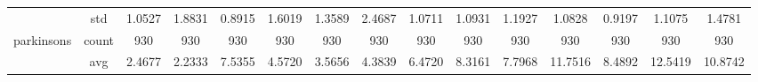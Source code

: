 \begin{table}[htbp]
{\begin{tabular}{rcccc|c|c|c|c|c|ccccc}
			                                                                               & std                                    & 1.0527                                                                             & 1.8831                                                                    & 0.8915                                                                    & 1.6019                                         & 1.3589                                                                    & 2.4687                                       & 1.0711                                      & 1.0931                                         & 1.1927                                         & 1.0828                                          & 0.9197                                          & 1.1075                                         & 1.4781                                         \\
			parkinsons                                                                     & count                                  & 930                                                                                & 930                                                                       & 930                                                                       & 930                                            & 930                                                                       & 930                                          & 930                                         & 930                                            & 930                                            & 930                                             & 930                                             & 930                                            & 930                                            \\
			                                                                               & avg                                    & 2.4677                                                                             & \cellcolor[rgb]{ .776,  .937,  .808}\textcolor[rgb]{ 0,  .38,  0}{2.2333} & 7.5355                                                                    & 4.5720                                         & 3.5656                                                                    & 4.3839                                       & 6.4720                                      & 8.3161                                         & 7.7968                                         & 11.7516                                         & 8.4892                                          & 12.5419                                        & 10.8742                                        \\

\end{tabular}}
\end{table}
